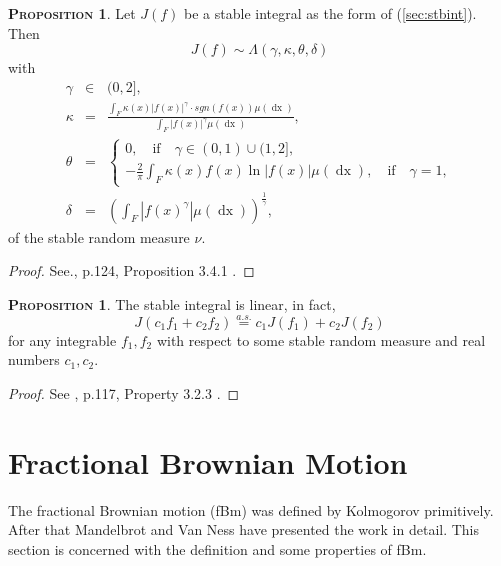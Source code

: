 \documentclass[a4paper, twoside, 11pt]{article}
\theoremstyle{definition}
\newtheorem{proposition}[definition]{\scshape Proposition}
\newcommand{\brkt}[1]{\left({#1} \right)}
\begin{document}
  \begin{proposition}
	Let $J(f)$ be a stable integral as the form of (\ref{sec:stbint}). Then 
	\begin{equation*}
	  J(f) \sim \Lambda(\gamma, \kappa, \theta, \delta)
	\end{equation*}
  with %
  \begin{eqnarray*}
  \gamma &\in& (0, 2],\\
  \kappa &=& \frac{\int_F \kappa(x) |f(x)|^\gamma\cdot sgn(f(x)) \mu(\mathop{dx})}{\int_F|f(x)|^\gamma\mu(\mathop{dx})},\\
  \theta &=&
  \begin{cases}
  0 , \hspace{1em} \text{if} \hspace{1em} \gamma \in (0, 1) \cup (1, 2],\\
	-\frac{2}{\pi}\int_F \kappa(x) f(x) \ln|f(x)|\mu(\mathop{dx}), \hspace{1em} \text{if} \hspace{1em} \gamma = 1,
  \end{cases}\\
  \delta &=& \brkt{\int_F |f(x)^\gamma|\mu(\mathop{dx})}^{\frac{1}{\gamma}}, 
  \end{eqnarray*}
  of the stable random measure $\nu$.
  \label{sec:stbint2}
  \end{proposition}
  \begin{proof}
	See.\cite{samorodnitsky}, p.124, Proposition 3.4.1 .
  \end{proof}
  \begin{proposition}
	The stable integral is linear, in fact,
  \begin{equation}
	J(c_1f_1 + c_2f_2) \overset{a.s.}{=}c_1J(f_1) + c_2J(f_2)
  \end{equation}
  for any integrable $f_1, f_2$ with respect to some stable random measure and real numbers $c_1, c_2$. 
  \label{sec:stblin}
  \end{proposition}
  \begin{proof}
	See \cite{samorodnitsky}, p.117, Property 3.2.3 .
  \end{proof}
  \newpage
  \section{Fractional Brownian Motion}
  \setcounter{equation}{0}
  The fractional Brownian motion (fBm) was defined by Kolmogorov\cite{kolm} primitively. After that Mandelbrot and Van Ness\cite{mandelbrot} have presented the work in detail. This section is concerned with the definition and some properties of fBm.
\end{document}
